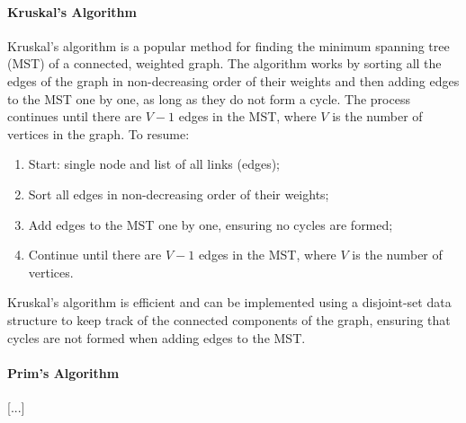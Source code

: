 \paragraph{Kruskal's Algorithm}
Kruskal's algorithm is a popular method for finding the minimum spanning tree (MST) of a connected, weighted graph. The algorithm works by sorting all the edges of the graph in non-decreasing order of their weights and then adding edges to the MST one by one, as long as they do not form a cycle. The process continues until there are \(V-1\) edges in the MST, where \(V\) is the number of vertices in the graph. To resume:
\begin{enumerate}
    \item Start: single node and list of all links (edges);
    \item Sort all edges in non-decreasing order of their weights;
    \item Add edges to the MST one by one, ensuring no cycles are formed;
    \item Continue until there are \(V-1\) edges in the MST, where \(V\) is the number of vertices.
\end{enumerate}

Kruskal's algorithm is efficient and can be implemented using a disjoint-set data structure to keep track of the connected components of the graph, ensuring that cycles are not formed when adding edges to the MST.

\paragraph{Prim's Algorithm}

[...]

